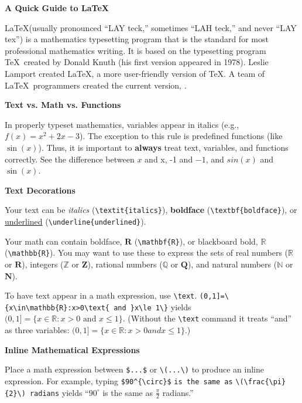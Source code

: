 \documentclass[10pt,landscape]{article}
\newcommand{\ColorSection}[1]{\par\vspace{1.5ex}\noindent\textcolor{sectioncolor}{\Large\bfseries #1}\par\vspace{0.75ex}}
\newcommand{\ColorSubsection}[1]{\par\vspace{1ex}\noindent\textcolor{subsectioncolor}{\normalsize\bfseries #1}\par\vspace{0.5ex}}
\begin{document}
\raggedright
\footnotesize


\begin{center}
\textcolor{titlecolor}{\Huge\bfseries A Quick Guide to \LaTeX}
\end{center}
\begin{multicols}{3}
\setlength{\premulticols}{1pt}
\setlength{\postmulticols}{1pt}
\setlength{\multicolsep}{1pt}
\setlength{\columnsep}{2pt}


\begin{tcolorbox}[notebox, title=What is \LaTeX?]
\LaTeX (usually pronounced ``LAY teck,'' sometimes ``LAH teck,'' and never ``LAY tex'') is a mathematics typesetting program that is the standard for most professional mathematics writing. It is based on the typesetting program \TeX\ created by Donald Knuth (his first version appeared in 1978). Leslie Lamport created \LaTeX, a more user-friendly version of \TeX. A team of \LaTeX\ programmers created the current version,  \LaTeXe.
\end{tcolorbox}



\ColorSection{Text vs. Math vs. Functions}
In properly typeset mathematics, variables appear in italics (e.g., $f(x)=x^{2}+2x-3$). The exception to this rule is predefined functions (like $\sin (x)$). Thus, it is important to \textbf{always} treat text, variables, and functions correctly. See the difference between $x$ and x, -1 and $-1$, and $sin(x)$ and $\sin(x)$.  

\ColorSubsection{Text Decorations}
Your text can be \textit{italics} (\verb!\textit{italics}!), \textbf{boldface} (\verb!\textbf{boldface}!), or \underline{underlined} (\verb!\underline{underlined}!).

Your math can contain boldface, $\mathbf{R}$ (\verb!\mathbf{R}!), or blackboard bold, $\mathbb{R}$ (\verb!\mathbb{R}!). You may want to use these to express the sets of real numbers ($\mathbb{R}$ or $\mathbf{R}$), integers ($\mathbb{Z}$ or $\mathbf{Z}$), rational numbers ($\mathbb{Q}$ or $\mathbf{Q}$), and natural numbers ($\mathbb{N}$ or $\mathbf{N}$).

To have text appear in a math expression, use \verb!\text!. \verb!(0,1]=\{x\in\mathbb{R}:x>0\text{ and }x\le 1\}! yields $(0,1]=\{x\in\mathbb{R}:x>0\text{ and }x\le 1\}$. (Without the \verb!\text! command it treats ``and'' as three variables: $(0,1]=\{x\in\mathbb{R}:x>0 and x\le 1\}$.)

\ColorSubsection{Inline Mathematical Expressions}
Place a math expression between \verb!$...$! or \verb!\(...\)! to produce an inline expression.  For example, typing \verb!$90^{\circ}$! \texttt{is the same as} \verb!\(\frac{\pi}{2}\) radians! yields ``$90^{\circ}$ is the same as $\frac{\pi}{2}$ radians.''


\end{multicols}
\end{document}
